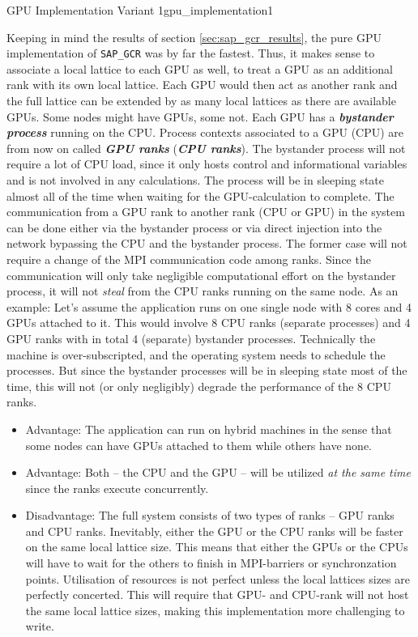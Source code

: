 \documentclass{article}
\theoremstyle{plain} %
\theoremstyle{convention} %
\theoremstyle{remark} %
\def\code#1{\texttt{#1}}
\def\df#1{\textbf{\textit{#1}}}
\numberwithin{equation}{section}
\begin{document}
\begin{proposal}{GPU Implementation Variant 1}{gpu_implementation1} %

Keeping in mind the results of section \ref{sec:sap_gcr_results}, the pure GPU implementation of \code{SAP\_GCR} was by far the fastest. Thus, it makes sense to associate a local lattice to each GPU as well, to treat a GPU as an additional rank with its own local lattice. Each GPU would then act as another rank and the full lattice can be extended by as many local lattices as there are available GPUs. Some nodes might have GPUs, some not. Each GPU has a \df{bystander process} running on the CPU. Process contexts associated to a GPU (CPU) are from now on called \df{GPU ranks} (\df{CPU ranks}). The bystander process will not require a lot of CPU load, since it only hosts control and informational variables and is not involved in any calculations. The process will be in sleeping state almost all of the time when waiting for the GPU-calculation to complete. The communication from a GPU rank to another rank (CPU or GPU) in the system can be done either via the bystander process or via direct injection into the network bypassing the CPU and the bystander process. The former case will not require a change of the MPI communication code among ranks. Since the communication will only take negligible computational effort on the bystander process, it will not \textit{steal} from the CPU ranks running on the same node. As an example: Let's assume the application runs on one single node with \num{8} cores and \num{4} GPUs attached to it. This would involve \num{8} CPU ranks (separate processes) and \num{4} GPU ranks with in total \num{4} (separate) bystander processes. Technically the machine is over-subscripted, and the operating system needs to schedule the processes. But since the bystander processes will be in sleeping state most of the time, this will not (or only negligibly) degrade the performance of the \num{8} CPU ranks.

\begin{itemize}
    \item Advantage: The application can run on hybrid machines in the sense that some nodes can have GPUs attached to them while others have none.
    \item Advantage: Both -- the CPU and the GPU -- will be utilized \textit{at the same time} since the ranks execute concurrently.
    \item Disadvantage: The full system consists of two types of ranks -- GPU ranks and CPU ranks. Inevitably, either the GPU or the CPU ranks will be faster on the same local lattice size. This means that either the GPUs or the CPUs will have to wait for the others to finish in MPI-barriers or synchronzation points. Utilisation of resources is not perfect unless the local lattices sizes are perfectly concerted. This will require that GPU- and CPU-rank will not host the same local lattice sizes, making this implementation more challenging to write.
\end{itemize}

\end{proposal}
\end{document}
